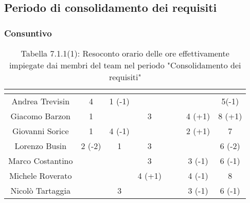 \subsection{Periodo di consolidamento dei requisiti}
\subsubsection{Consuntivo}
\renewcommand{\arraystretch}{1.5}
\begin{table}[H]
\begin{center}
\begin{tabular}{|c|c|c|c|c|c|c|c|}
\hline
\rowcolor{title_row}
\textbf{\color{title_text}{Nome}} & \textbf{\color{title_text}{Resp.}} & \textbf{\color{title_text}{Ammi.}} & \textbf{\color{title_text}{Analist.}} & \textbf{\color{title_text}{Progett.}} & \textbf{\color{title_text}{Program.}} & \textbf{\color{title_text}{Verific.}} & \textbf{\color{title_text}{Totale}} \\ \hline
Andrea Trevisin  & 4 & 1 (-1) & & & & & 5(-1) \\ \hline
Giacomo Barzon   & 1 & & 3 & & & 4 (+1) & 8 (+1) \\ \hline
Giovanni Sorice  & 1 & 4 (-1) & & & & 2 (+1) & 7  \\ \hline
Lorenzo Busin    & 2 (-2) & 1 & 3 & & & & 6 (-2) \\ \hline
Marco Costantino & & & 3 & & & 3 (-1) & 6 (-1) \\ \hline
Michele Roverato & & & 4 (+1) & & & 4 (-1) & 8 \\ \hline
Nicolò Tartaggia & & 3 & & & & 3 (-1) & 6 (-1)  \\ \hline
\end{tabular}
\caption{Tabella 7.1.1(1): Resoconto orario delle ore effettivamente impiegate dai membri del team nel periodo "Consolidamento dei requisiti"\label{}}
\end{center}
\end{table}
\renewcommand{\arraystretch}{1}

